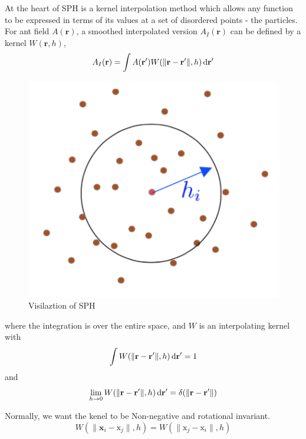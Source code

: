     At the heart of SPH is a kernel interpolation method which allows any function to be expressed in terms of its values at a set of disordered points - the particles\cite{monaghan1992smoothed}. For ant field $A(\textbf{r})$, a smoothed interpolated version $A_{I}(\textbf{r})$ can be defined by a kernel $W(\textbf{r}, h)$,
    \begin{equation}
        A_{I}(\textbf{r}) = \int A({\textbf{r}}^{\prime})W(\|\textbf{r} - \textbf{r}^{\prime}\|, h)\,\mathrm{d}\textbf{r}^{\prime}
    \end{equation}
    \begin{figure}[h!]
        \centering
        \includegraphics[scale = 0.8]{Figures/sph}
        \caption{Visilaztion of SPH}
    \end{figure}

    where the integration is over the entire space, and $W$ is an interpolating kernel with 
    \begin{equation}
        \int W(\|\textbf{r} - \textbf{r}^{\prime}\|, h)\,\mathrm{d} \textbf{r}^{\prime} = 1
    \end{equation}
    and
    \begin{equation}
        \lim_{h\to 0} W(\|\textbf{r} - \textbf{r}^{\prime}\|, h)\,\mathrm{d}\textbf{r}^{\prime} = \delta(\|\textbf{r} - \textbf{r}^{\prime}\|) 
    \end{equation}

    Normally, we want the kenel to be Non-negative and rotational invariant.
    \begin{equation}
        W(\|\textbf{x}_{i} - \text{x}_{j}\|, h) = W(\|\text{x}_{j} - \text{x}_{i}\|, h)
    \end{equation}

